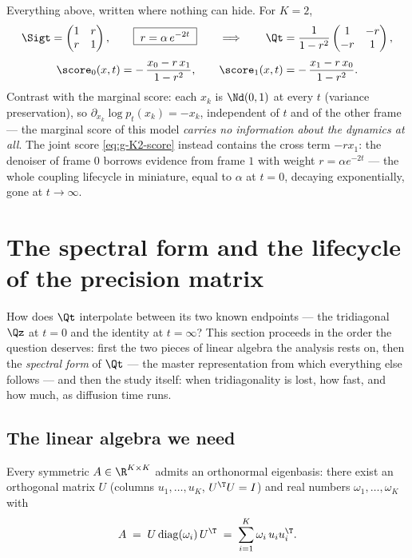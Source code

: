 Everything above, written where nothing can hide. For $K = 2$,
\begin{equation}
  \Sigt = \begin{pmatrix} 1 & r \\ r & 1 \end{pmatrix},
  \qquad \boxed{\; r = \alpha\, e^{-2t} \;}
  \qquad\Longrightarrow\qquad
  \Qt = \frac{1}{1 - r^2}
  \begin{pmatrix} 1 & -r \\ -r & 1 \end{pmatrix},
  \label{eq:g-K2}
\end{equation}
\begin{equation}
  \score_0(x, t) = -\,\frac{x_0 - r\, x_1}{1 - r^2},
  \qquad
  \score_1(x, t) = -\,\frac{x_1 - r\, x_0}{1 - r^2}.
  \label{eq:g-K2-score}
\end{equation}
Contrast with the marginal score: each $x_k$ is $\Nd(0,1)$ at every $t$
(variance preservation), so $\partial_{x_k} \log p_t(x_k) = -x_k$,
independent of $t$ and of the other frame --- the marginal score of this
model \emph{carries no information about the dynamics at all}. The joint
score \eqref{eq:g-K2-score} instead contains the cross term $-r x_1$: the
denoiser of frame $0$ borrows evidence from frame $1$ with weight
$r = \alpha e^{-2t}$ --- the whole coupling lifecycle in miniature, equal to
$\alpha$ at $t = 0$, decaying exponentially, gone at $t \to \infty$.

\section{The spectral form and the lifecycle of the precision matrix}
\label{sec:g-lifecycle}

How does $\Qt$ interpolate between its two known endpoints --- the
tridiagonal $\Qz$ at $t = 0$ and the identity at $t = \infty$? This section
proceeds in the order the question deserves: first the two pieces of linear
algebra the analysis rests on, then the \emph{spectral form} of $\Qt$ ---
the master representation from which everything else follows --- and then
the study itself: when tridiagonality is lost, how fast, and how much, as
diffusion time runs.

\subsection{The linear algebra we need}\label{sec:g-linalg}

\begin{theorem}\label{thm:g-spectral}
Every symmetric $A \in \R^{K \times K}$ admits an orthonormal eigenbasis:
there exist an orthogonal matrix $U$ (columns $u_1, \dots, u_K$,
$U^\T U = I$) and real numbers $\omega_1, \dots, \omega_K$ with
\begin{equation}
  A \;=\; U \operatorname{diag}(\omega_i)\, U^\T
  \;=\; \sum_{i=1}^{K} \omega_i\, u_i u_i^\T .
  \label{eq:g-spectral-thm}
\end{equation}
\end{theorem}

